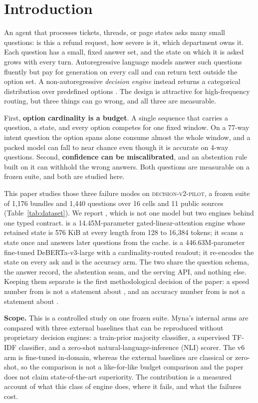 \section{Introduction}
\label{sec:intro}

An agent that processes tickets, threads, or page states asks many small questions: is this a refund request, how severe is it, which department owns it. Each question has a small, fixed answer set, and the state on which it is asked grows with every turn. Autoregressive language models answer such questions fluently but pay for generation on every call and can return text outside the option set. A non-autoregressive \emph{decision engine} instead returns a categorical distribution over predefined options \cite{li2026jev,duan2026gdm}. The design is attractive for high-frequency routing, but three things can go wrong, and all three are measurable.

First, \textbf{option cardinality is a budget}. A single sequence that carries a question, a state, and every option competes for one fixed window. On a 77-way intent question the option spans alone consume almost the whole window, and a packed model can fall to near chance even though it is accurate on 4-way questions. Second, \textbf{confidence can be miscalibrated}, and an abstention rule built on it can withhold the wrong answers. Both questions are measurable on a frozen suite, and both are studied here.

This paper studies those three failure modes on \textsc{decision-v2-pilot}, a frozen suite of 1{,}176 bundles and 1{,}440 questions over 16 cells and 11 public sources (Table~\ref{tab:dataset}). We report \myna, which is not one model but two engines behind one typed contract. \stream{} is a 14.45M-parameter gated-linear-attention engine whose retained state is 576 KiB at every length from 128 to 16{,}384 tokens; it scans a state once and answers later questions from the cache. \vsix{} is a 446.63M-parameter fine-tuned DeBERTa-v3-large with a cardinality-routed readout; it re-encodes the state on every ask and is the accuracy arm. The two share the question schema, the answer record, the abstention seam, and the serving API, and nothing else. Keeping them separate is the first methodological decision of the paper: a speed number from \stream{} is not a statement about \vsix{}, and an accuracy number from \vsix{} is not a statement about \stream{}.

\textbf{Scope.} This is a controlled study on one frozen suite. Myna's internal arms are compared with three external baselines that can be reproduced without proprietary decision engines: a train-prior majority classifier, a supervised TF-IDF classifier, and a zero-shot natural-language-inference (NLI) scorer. The v6 arm is fine-tuned in-domain, whereas the external baselines are classical or zero-shot, so the comparison is not a like-for-like budget comparison and the paper does not claim state-of-the-art superiority. The contribution is a measured account of what this class of engine does, where it fails, and what the failures cost.

